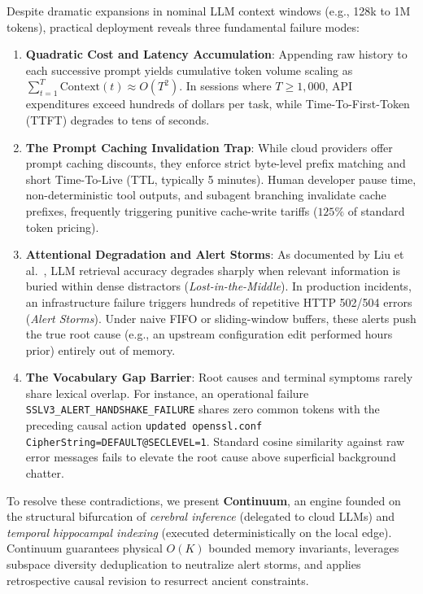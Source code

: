 \documentclass[10pt,journal,compsoc]{IEEEtran}
\begin{document}
Despite dramatic expansions in nominal LLM context windows (e.g., 128k to 1M tokens), practical deployment reveals three fundamental failure modes:
\begin{enumerate}
    \item \textbf{Quadratic Cost and Latency Accumulation}: Appending raw history to each successive prompt yields cumulative token volume scaling as $\sum_{t=1}^T \text{Context}(t) \approx O(T^2)$. In sessions where $T \ge 1,000$, API expenditures exceed hundreds of dollars per task, while Time-To-First-Token (TTFT) degrades to tens of seconds.
    \item \textbf{The Prompt Caching Invalidation Trap}: While cloud providers offer prompt caching discounts, they enforce strict byte-level prefix matching and short Time-To-Live (TTL, typically 5 minutes). Human developer pause time, non-deterministic tool outputs, and subagent branching invalidate cache prefixes, frequently triggering punitive cache-write tariffs ($125\%$ of standard token pricing).
    \item \textbf{Attentional Degradation and Alert Storms}: As documented by Liu et al.~\cite{liu2024lostinthemiddle}, LLM retrieval accuracy degrades sharply when relevant information is buried within dense distractors (\textit{Lost-in-the-Middle}). In production incidents, an infrastructure failure triggers hundreds of repetitive HTTP 502/504 errors (\textit{Alert Storms}). Under naive FIFO or sliding-window buffers, these alerts push the true root cause (e.g., an upstream configuration edit performed hours prior) entirely out of memory.
    \item \textbf{The Vocabulary Gap Barrier}: Root causes and terminal symptoms rarely share lexical overlap. For instance, an operational failure \texttt{SSLV3\_ALERT\_HANDSHAKE\_FAILURE} shares zero common tokens with the preceding causal action \texttt{updated openssl.conf CipherString=DEFAULT@SECLEVEL=1}. Standard cosine similarity against raw error messages fails to elevate the root cause above superficial background chatter.
\end{enumerate}

To resolve these contradictions, we present \textbf{Continuum}, an engine founded on the structural bifurcation of \textit{cerebral inference} (delegated to cloud LLMs) and \textit{temporal hippocampal indexing} (executed deterministically on the local edge). Continuum guarantees physical $O(K)$ bounded memory invariants, leverages subspace diversity deduplication to neutralize alert storms, and applies retrospective causal revision to resurrect ancient constraints.
\end{document}
